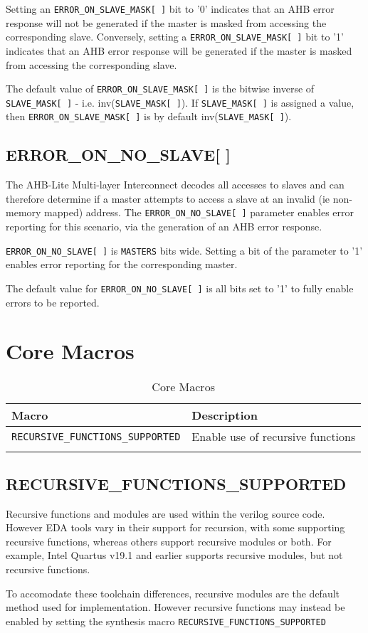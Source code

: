 Setting an \texttt{ERROR\_ON\_SLAVE\_MASK[\,]} bit to '0' indicates that an AHB error response will not be generated
if the master is masked from accessing the corresponding slave.
Conversely, setting a \texttt{ERROR\_ON\_SLAVE\_MASK[\,]} bit to '1' indicates that an AHB error response will
be generated if the master is masked from accessing the corresponding slave.

The default value of \texttt{ERROR\_ON\_SLAVE\_MASK[\,]} is the bitwise inverse of \texttt{SLAVE\_MASK[\,]} - i.e. inv(\texttt{SLAVE\_MASK[\,]}). If \texttt{SLAVE\_MASK[\,]} is assigned a value, then \texttt{ERROR\_ON\_SLAVE\_MASK[\,]} is by default inv(\texttt{SLAVE\_MASK[\,]}).

\subsection{ERROR\_ON\_NO\_SLAVE[ ]}\label{error_on_no_slave}

The AHB-Lite Multi-layer Interconnect decodes all accesses to slaves and can therefore determine if a master attempts to access a slave at an invalid (ie non-memory mapped) address. The \texttt{ERROR\_ON\_NO\_SLAVE[\,]} parameter enables error reporting for this scenario, via the generation of an AHB error response.

\texttt{ERROR\_ON\_NO\_SLAVE[\,]} is \texttt{MASTERS} bits wide. Setting a bit of the parameter to '1' enables error reporting for the corresponding master. 

The default value for \texttt{ERROR\_ON\_NO\_SLAVE[\,]} is all bits set to '1' to fully enable errors to be reported.

\section{Core Macros}\label{core-macros}

\begin{longtable}[]{@{}ll@{}}
\toprule
Macro & Description\tabularnewline
\midrule
\endhead
\texttt{RECURSIVE\_FUNCTIONS\_SUPPORTED} & Enable use of recursive functions \tabularnewline
\bottomrule
\caption{Core Macros}
\end{longtable}

\subsection{RECURSIVE\_FUNCTIONS\_SUPPORTED}\label{recursive_functions_supported}

Recursive functions and modules are used within the verilog source code. However EDA tools vary in their support for recursion, with some supporting recursive functions, whereas others support recursive modules or both. For example, Intel Quartus v19.1 and earlier supports recursive modules, but not recursive functions. 

To accomodate these toolchain differences, recursive modules are the default method used for implementation. However recursive functions may instead be enabled by setting the synthesis macro \texttt{RECURSIVE\_FUNCTIONS\_SUPPORTED}
